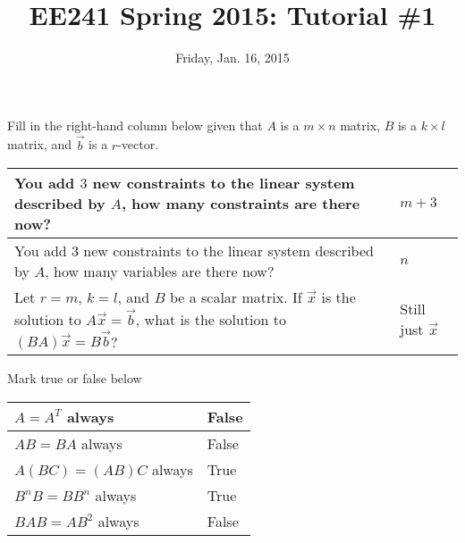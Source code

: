\documentclass{tutorial}
\begin{document}
\newif\ifsolns

\solnstrue

\title{EE241 Spring 2015: Tutorial \#1}
\date{Friday, Jan. 16, 2015}
\maketitle



\begin{prob}
\par Fill in the right-hand column below given that $A$ is a $m \times n$ matrix, $B$ is a $k \times l$ matrix, and $\vec{b}$ is a $r$-vector.
\par \def\arraystretch{2} \begin{tabular}{|p{}|p{}|}
\hline 				You add $3$ new constraints to the linear system described by $A$, how many constraints are there now?
& \ifsolns		$m+3$
\else \hspace{0.3\textwidth}
\fi \\ \hline 		You add $3$ new constraints to the linear system described by $A$, how many variables are there now?
& \ifsolns		$n$

\fi \\ \hline 		Let $r=m$, $k=l$, and $B$ be a scalar matrix. If $\vec{x}$ is the solution to $A\vec{x} = \vec{b}$, what is the solution to $(BA)\vec{x} = B\vec{b}$?
& \ifsolns		Still just $\vec{x}$

\fi \\ \hline \end{tabular}

\par Mark true or false below
\par \def\arraystretch{2} \begin{tabular}{|p{}|p{}|}
\hline 				$A=A^T$ always
& \ifsolns		False
\else \hspace{0.3\textwidth}
\fi \\ \hline 		$AB = BA$ always
& \ifsolns		False

\fi \\ \hline 		$A(BC) = (AB)C$ always
& \ifsolns		True	

\fi \\ \hline 		$B^nB = BB^n$ always
& \ifsolns		True

\fi \\ \hline 		$BAB = AB^2$ always
& \ifsolns		False

\fi \\ \hline \end{tabular}
\end{prob} 
\end{document}
